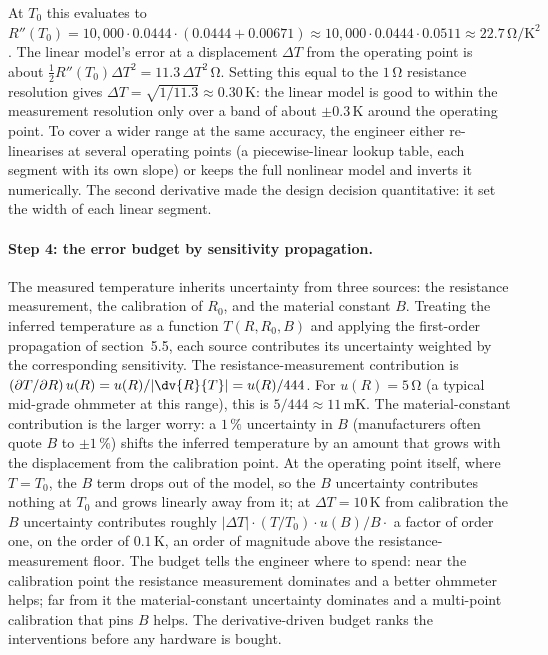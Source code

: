 At $T_{0}$ this evaluates to $R''(T_{0}) = 10{,}000 \cdot 0.0444
\cdot (0.0444 + 0.00671) \approx 10{,}000 \cdot 0.0444 \cdot
0.0511 \approx 22.7\,\si{\ohm\per\kelvin\squared}$. The linear
model's error at a displacement $\Delta T$ from the operating point
is about $\tfrac{1}{2} R''(T_{0}) \Delta T^{2} = 11.3\,\Delta T^{2}\,
\si{\ohm}$. Setting this equal to the $1\,\si{\ohm}$ resistance
resolution gives $\Delta T = \sqrt{1/11.3} \approx 0.30\,\si
{\kelvin}$: the linear model is good to within the measurement
resolution only over a band of about $\pm 0.3\,\si{\kelvin}$ around
the operating point. To cover a wider range at the same accuracy,
the engineer either re-linearises at several operating points (a
piecewise-linear lookup table, each segment with its own slope) or
keeps the full nonlinear model and inverts it numerically. The
second derivative made the design decision quantitative: it set the
width of each linear segment.

\paragraph{Step 4: the error budget by sensitivity propagation.}
The measured temperature inherits uncertainty from three sources:
the resistance measurement, the calibration of $R_{0}$, and the
material constant $B$. Treating the inferred temperature as a
function $T(R, R_{0}, B)$ and applying the first-order propagation
of section~5.5, each source contributes its uncertainty weighted by
the corresponding sensitivity. The resistance-measurement
contribution is $(\partial T/\partial R)\,u(R) = u(R)/|\dv{R}{T}|
= u(R)/444$. For $u(R) = 5\,\si{\ohm}$ (a typical mid-grade
ohmmeter at this range), this is $5/444 \approx 11\,\si{\milli
\kelvin}$. The material-constant contribution is the larger worry:
a $1\,\%$ uncertainty in $B$ (manufacturers often quote $B$ to
$\pm 1\,\%$) shifts the inferred temperature by an amount that
grows with the displacement from the calibration point. At the
operating point itself, where $T = T_{0}$, the $B$ term drops out
of the model, so the $B$ uncertainty contributes nothing at $T_{0}$
and grows linearly away from it; at $\Delta T = 10\,\si{\kelvin}$
from calibration the $B$ uncertainty contributes roughly
$|\Delta T| \cdot (T/T_{0}) \cdot u(B)/B \cdot$ a factor of order
one, on the order of $0.1\,\si{\kelvin}$, an order of magnitude
above the resistance-measurement floor. The budget tells the
engineer where to spend: near the calibration point the resistance
measurement dominates and a better ohmmeter helps; far from it the
material-constant uncertainty dominates and a multi-point
calibration that pins $B$ helps. The derivative-driven budget
ranks the interventions before any hardware is bought.

